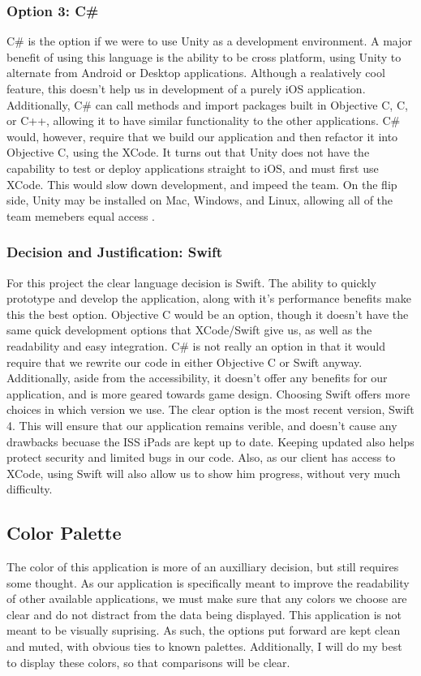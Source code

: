 \documentclass[onecolumn, draftclsnofoot,10pt, compsoc]{IEEEtran}
\begin{document}
\subsubsection{Option 3: C\#}
C\# is the option if we were to use Unity as a development environment.
A major benefit of using this language is the ability to be cross platform, using Unity to alternate from Android or Desktop applications.
Although a realatively cool feature, this doesn't help us in development of a purely iOS application.
Additionally, C\# can call methods and import packages built in Objective C, C, or C++, allowing it to have similar functionality to the other applications.
C\# would, however, require that we build our application and then refactor it into Objective C, using the XCode.
It turns out that Unity does not have the capability to test or deploy applications straight to iOS, and must first use XCode.
This would slow down development, and impeed the team.
On the flip side, Unity may be installed on Mac, Windows, and Linux, allowing all of the team memebers equal access \cite{objc1}.

\subsubsection{Decision and Justification: Swift}
For this project the clear language decision is Swift.
The ability to quickly prototype and develop the application, along with it's performance benefits make this the best option.
Objective C would be an option, though it doesn't have the same quick development options that XCode/Swift give us, as well as the readability and easy integration.
C\# is not really an option in that it would require that we rewrite our code in either Objective C or Swift anyway.
Additionally, aside from the accessibility, it doesn't offer any benefits for our application, and is more geared towards game design.
Choosing Swift offers more choices in which version we use.
The clear option is the most recent version, Swift 4.
This will ensure that our application remains verible, and doesn't cause any drawbacks becuase the ISS iPads are kept up to date.
Keeping updated also helps protect security and limited bugs in our code.
Also, as our client has access to XCode, using Swift will also allow us to show him progress, without very much difficulty.

\subsection{Color Palette}
The color of this application is more of an auxilliary decision, but still requires some thought.
As our application is specifically meant to improve the readability of other available applications, we must make sure that any colors we choose are clear and do not distract from the data being displayed.
This application is not meant to be visually suprising.
As such, the options put forward are kept clean and muted, with obvious ties to known palettes.
Additionally, I will do my best to display these colors, so that comparisons will be clear.
\end{document}
